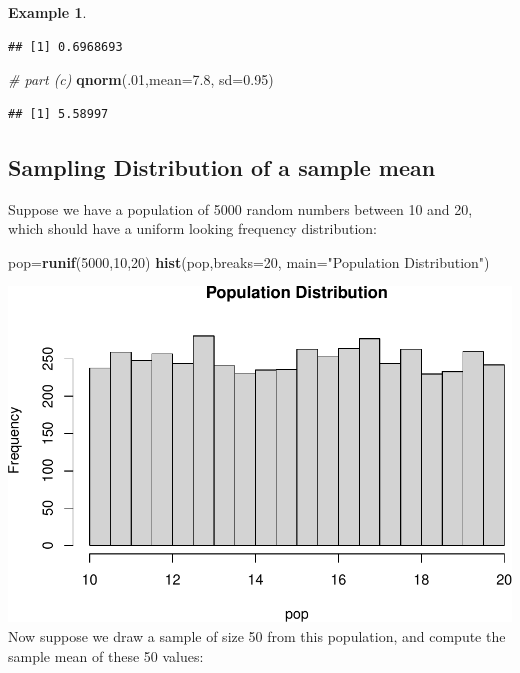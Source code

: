 \documentclass[
]{book}
\newenvironment{Shaded}{\begin{snugshade}}{\end{snugshade}}
\newcommand{\AttributeTok}[1]{\textcolor[rgb]{0.13,0.29,0.53}{#1}}
\newcommand{\CommentTok}[1]{\textcolor[rgb]{0.56,0.35,0.01}{\textit{#1}}}
\newcommand{\DecValTok}[1]{\textcolor[rgb]{0.00,0.00,0.81}{#1}}
\newcommand{\FloatTok}[1]{\textcolor[rgb]{0.00,0.00,0.81}{#1}}
\newcommand{\FunctionTok}[1]{\textcolor[rgb]{0.13,0.29,0.53}{\textbf{#1}}}
\newcommand{\NormalTok}[1]{#1}
\newcommand{\OtherTok}[1]{\textcolor[rgb]{0.56,0.35,0.01}{#1}}
\newcommand{\StringTok}[1]{\textcolor[rgb]{0.31,0.60,0.02}{#1}}
\theoremstyle{definition}
\theoremstyle{definition}
\newtheorem{example}{Example}[chapter]
\theoremstyle{definition}
\theoremstyle{definition}
\theoremstyle{remark}
\begin{document}
\begin{example}
\begin{verbatim}
## [1] 0.6968693
\end{verbatim}

\begin{Shaded}
\begin{Highlighting}[]
\CommentTok{\# part (c)}
\FunctionTok{qnorm}\NormalTok{(.}\DecValTok{01}\NormalTok{,}\AttributeTok{mean=}\FloatTok{7.8}\NormalTok{, }\AttributeTok{sd=}\FloatTok{0.95}\NormalTok{)}
\end{Highlighting}
\end{Shaded}

\begin{verbatim}
## [1] 5.58997
\end{verbatim}

\end{example}

\subsection*{Sampling Distribution of a sample mean}\label{sampling-distribution-of-a-sample-mean}

Suppose we have a population of 5000 random numbers between 10 and 20, which should have a uniform looking frequency distribution:

\begin{Shaded}
\begin{Highlighting}[]
\NormalTok{pop}\OtherTok{=}\FunctionTok{runif}\NormalTok{(}\DecValTok{5000}\NormalTok{,}\DecValTok{10}\NormalTok{,}\DecValTok{20}\NormalTok{)}
\FunctionTok{hist}\NormalTok{(pop,}\AttributeTok{breaks=}\DecValTok{20}\NormalTok{, }\AttributeTok{main=}\StringTok{"Population Distribution"}\NormalTok{)}
\end{Highlighting}
\end{Shaded}

\includegraphics{math340-notes_files/figure-latex/unnamed-chunk-197-1.pdf}
Now suppose we draw a sample of size 50 from this population, and compute the sample mean of these 50 values:
\end{document}
